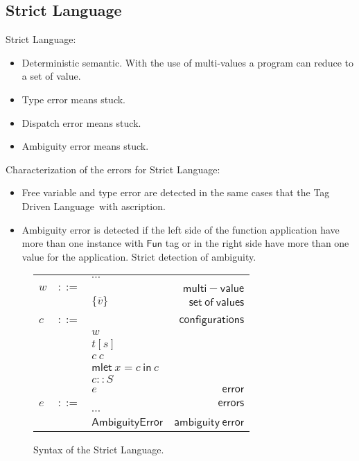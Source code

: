 \documentclass[preprint,authoryear,sort&compress,9pt,nocopyrightspace]{article}
\newcommand{\ascripS}[1]{#1::S}
\newcommand{\oletP}[3]{\mathsf{mlet} \ x = #2 \ \mathsf{in}  \ #3}
\newcommand{\funt}{\mathsf{Fun}}
\newcommand{\nameerror}{\mathsf{NameError}}
\newcommand{\typeerror}{\mathsf{TagError}}
\newcommand{\dispatcherror}{\mathsf{DispatchError}}
\newcommand{\ambiguityerror}{\mathsf{AmbiguityError}}
\newcommand{\semanticB}{Tag Driven Language}
\newcommand{\semanticC}{Strict Language}
\begin{document}
\subsection{\semanticC}


\semanticC:
\begin{itemize}\item Deterministic semantic. With the use of multi-values a program can reduce to a set of value.
\item Type error means stuck.
\item Dispatch error means stuck.
\item Ambiguity error means stuck.
\end{itemize}
Characterization of the errors for \semanticC:
\begin{itemize}
\item Free variable and type error are detected in the same cases that the \semanticB \ with ascription.
\item Ambiguity error is detected if the left side of the function application  have more than one instance with $\funt$ tag or in the right side have more than one value for the application. Strict detection of ambiguity. 
\end{itemize}

\begin{figure}[]
\begin{small}
\begin{center}
\hspace*{-2cm}
\begin{tabular}{|l c l r|}
\hline
&&$\cdots$&\\
$w$&$::=$&&$\mathsf {multi-value}$\\
&&$\{\overline{v}\}$&$\mathsf {set \ of \ values}$\\
&&&\\
$c$&$::=$&&$\mathsf {configurations}$\\
&&$w$&\\
&&$t[s]$&\\
&&$c \ c $&\\
&&$\oletP {T}{c}{c}$&\\
&&$\ascripS{c}$&\\
&&$e$&$\mathsf {error}$\\
&&&\\
$e$&$::=$&&$\mathsf {errors}$\\
&&$\cdots$&\\
&&$\ambiguityerror$&$\mathsf {ambiguity \ error}$\\
\hline
\end{tabular}
\hspace*{-2cm}
\caption{Syntax of the \semanticC.}
\label{figure:SYNTAX4}
\end{center}
\end{small}
\end{figure}
\end{document}

